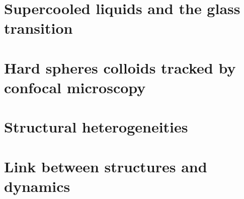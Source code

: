 %

\section{Supercooled liquids and the glass transition}


\section{Hard spheres colloids tracked by confocal microscopy}


\section[Structure]{Structural heterogeneities}


\section[Link with dynamics]{Link between structures and dynamics}


\appendix


